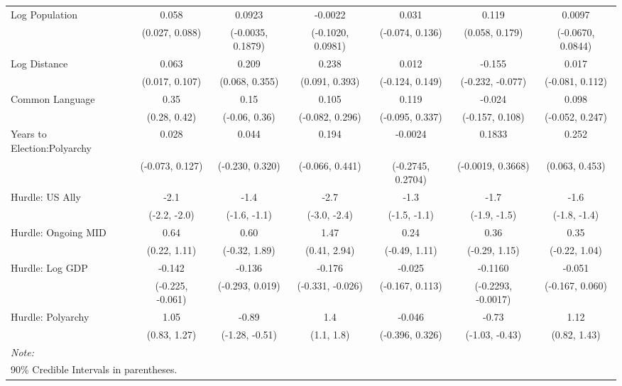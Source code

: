 \begin{table}[H]
\begin{tabular}[t]{lcccccc}
Log Population & 0.058 & 0.0923 & -0.0022 & 0.031 & 0.119 & 0.0097\\
 & (0.027, 0.088) & (-0.0035, 0.1879) & (-0.1020, 0.0981) & (-0.074, 0.136) & (0.058, 0.179) & (-0.0670, 0.0844)\\
Log Distance & 0.063 & 0.209 & 0.238 & 0.012 & -0.155 & 0.017\\
 & (0.017, 0.107) & (0.068, 0.355) & (0.091, 0.393) & (-0.124, 0.149) & (-0.232, -0.077) & (-0.081, 0.112)\\
Common Language & 0.35 & 0.15 & 0.105 & 0.119 & -0.024 & 0.098\\
 & (0.28, 0.42) & (-0.06, 0.36) & (-0.082, 0.296) & (-0.095, 0.337) & (-0.157, 0.108) & (-0.052, 0.247)\\
Years to Election:Polyarchy & 0.028 & 0.044 & 0.194 & -0.0024 & 0.1833 & 0.252\\
 & (-0.073, 0.127) & (-0.230, 0.320) & (-0.066, 0.441) & (-0.2745, 0.2704) & (-0.0019, 0.3668) & (0.063, 0.453)\\
Hurdle: US Ally & -2.1 & -1.4 & -2.7 & -1.3 & -1.7 & -1.6\\
 & (-2.2, -2.0) & (-1.6, -1.1) & (-3.0, -2.4) & (-1.5, -1.1) & (-1.9, -1.5) & (-1.8, -1.4)\\
Hurdle: Ongoing MID & 0.64 & 0.60 & 1.47 & 0.24 & 0.36 & 0.35\\
 & (0.22, 1.11) & (-0.32, 1.89) & (0.41, 2.94) & (-0.49, 1.11) & (-0.29, 1.15) & (-0.22, 1.04)\\
Hurdle: Log GDP & -0.142 & -0.136 & -0.176 & -0.025 & -0.1160 & -0.051\\
 & (-0.225, -0.061) & (-0.293, 0.019) & (-0.331, -0.026) & (-0.167, 0.113) & (-0.2293, -0.0017) & (-0.167, 0.060)\\
Hurdle: Polyarchy & 1.05 & -0.89 & 1.4 & -0.046 & -0.73 & 1.12\\
 & (0.83, 1.27) & (-1.28, -0.51) & (1.1, 1.8) & (-0.396, 0.326) & (-1.03, -0.43) & (0.82, 1.43)\\
\bottomrule
\multicolumn{7}{l}{\rule{0pt}{1em}\textit{Note: }}\\
\multicolumn{7}{l}{\rule{0pt}{1em}90\% Credible Intervals in parentheses.}\\
\end{tabular}
\end{table}

